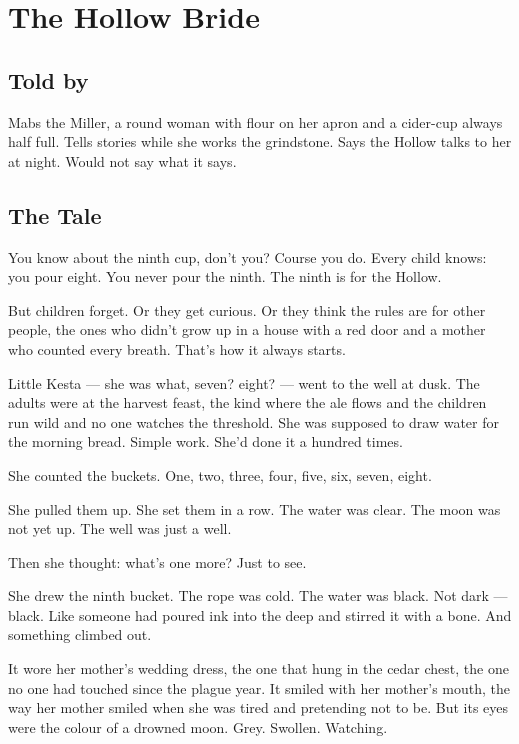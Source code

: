 \chapter{The Hollow Bride}

\section*{Told by}

Mabs the Miller, a round woman with flour on her apron and a cider-cup always half full. Tells stories while she works the grindstone. Says the Hollow talks to her at night. Would not say what it says.

\section*{The Tale}

You know about the ninth cup, don't you? Course you do. Every child knows: you pour eight. You never pour the ninth. The ninth is for the Hollow.

But children forget. Or they get curious. Or they think the rules are for other people, the ones who didn't grow up in a house with a red door and a mother who counted every breath. That's how it always starts.

Little Kesta --- she was what, seven? eight? --- went to the well at dusk. The adults were at the harvest feast, the kind where the ale flows and the children run wild and no one watches the threshold. She was supposed to draw water for the morning bread. Simple work. She'd done it a hundred times.

She counted the buckets. One, two, three, four, five, six, seven, eight.

She pulled them up. She set them in a row. The water was clear. The moon was not yet up. The well was just a well.

Then she thought: what's one more? Just to see.

She drew the ninth bucket. The rope was cold. The water was black. Not dark --- black. Like someone had poured ink into the deep and stirred it with a bone. And something climbed out.

It wore her mother's wedding dress, the one that hung in the cedar chest, the one no one had touched since the plague year. It smiled with her mother's mouth, the way her mother smiled when she was tired and pretending not to be. But its eyes were the colour of a drowned moon. Grey. Swollen. Watching.

